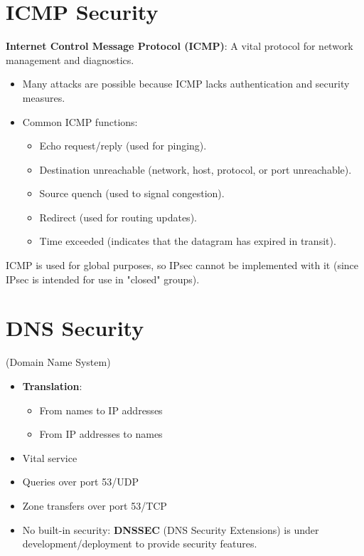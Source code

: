 \section{ICMP Security}
\textbf{Internet Control Message Protocol (ICMP)}: A vital protocol for network management and diagnostics.
\begin{itemize}
    \item Many attacks are possible because ICMP lacks authentication and security measures.
    \item Common ICMP functions:
    \begin{itemize}
        \item Echo request/reply (used for pinging).
        \item Destination unreachable (network, host, protocol, or port unreachable).
        \item Source quench (used to signal congestion).
        \item Redirect (used for routing updates).
        \item Time exceeded (indicates that the datagram has expired in transit).
    \end{itemize}
\end{itemize}

\begin{tcolorbox}[colback=blue!10!white, colframe=blue!50!white, title=ICMP and IPsec]
ICMP is used for global purposes, so IPsec cannot be implemented with it (since IPsec is intended for use in "closed" groups).
\end{tcolorbox}

\section{DNS Security}
\begin{center}
    (Domain Name System)
\end{center}

\begin{itemize}
    \item \textbf{Translation}: 
    \begin{itemize}
        \item From names to IP addresses
        \item From IP addresses to names
    \end{itemize}
    \item Vital service
    \item Queries over port 53/UDP
    \item Zone transfers over port 53/TCP
    \item No built-in security: \textbf{DNSSEC} (DNS Security Extensions) is under development/deployment to provide security features.
\end{itemize}

